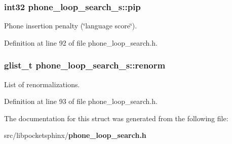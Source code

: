 \subsubsection[{pip}]{\setlength{\rightskip}{0pt plus 5cm}int32 phone\-\_\-loop\-\_\-search\-\_\-s\-::pip}\label{structphone__loop__search__s_ac979bc57a659c7853eec1854dbcbfabe}


Phone insertion penalty (\char`\"{}language score\char`\"{}). 



Definition at line 92 of file phone\-\_\-loop\-\_\-search.\-h.

\subsubsection[{renorm}]{\setlength{\rightskip}{0pt plus 5cm}glist\-\_\-t phone\-\_\-loop\-\_\-search\-\_\-s\-::renorm}\label{structphone__loop__search__s_a273295fbe1a22ad3ddf7db8695a394ec}


List of renormalizations. 



Definition at line 93 of file phone\-\_\-loop\-\_\-search.\-h.



The documentation for this struct was generated from the following file\-:\begin{DoxyCompactItemize}
\item 
src/libpocketsphinx/{\bf phone\-\_\-loop\-\_\-search.\-h}\end{DoxyCompactItemize}
